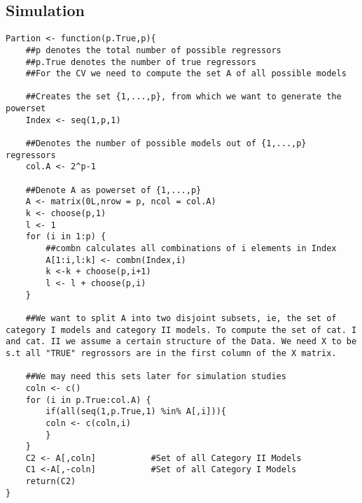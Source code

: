 \documentclass[Research_Module_ES.tex]{subfiles}
\begin{document}
\subsection{Simulation}
\begin{lstlisting}[title={Function inorder to calculate the set of category I and II models }]
Partion <- function(p.True,p){
	##p denotes the total number of possible regressors 
	##p.True denotes the number of true regressors
	##For the CV we need to compute the set A of all possible models 
	
	##Creates the set {1,...,p}, from which we want to generate the powerset
	Index <- seq(1,p,1)                        

	##Denotes the number of possible models out of {1,...,p} regressors 
	col.A <- 2^p-1                                           

	##Denote A as powerset of {1,...,p}
	A <- matrix(0L,nrow = p, ncol = col.A)      
	k <- choose(p,1)
	l <- 1
	for (i in 1:p) {
		##combn calculates all combinations of i elements in Index
		A[1:i,l:k] <- combn(Index,i)             
		k <-k + choose(p,i+1)
		l <- l + choose(p,i)
	}

	##We want to split A into two disjoint subsets, ie, the set of category I models and category II models. To compute the set of cat. I and cat. II we assume a certain structure of the Data. We need X to be s.t all "TRUE" regrossors are in the first column of the X matrix.
	
	##We may need this sets later for simulation studies
	coln <- c()
	for (i in p.True:col.A) {
		if(all(seq(1,p.True,1) %in% A[,i])){    
		coln <- c(coln,i)
		}
	}
	C2 <- A[,coln]           #Set of all Category II Models
	C1 <-A[,-coln]           #Set of all Category I Models
	return(C2)
}
\end{lstlisting}
\end{document}
